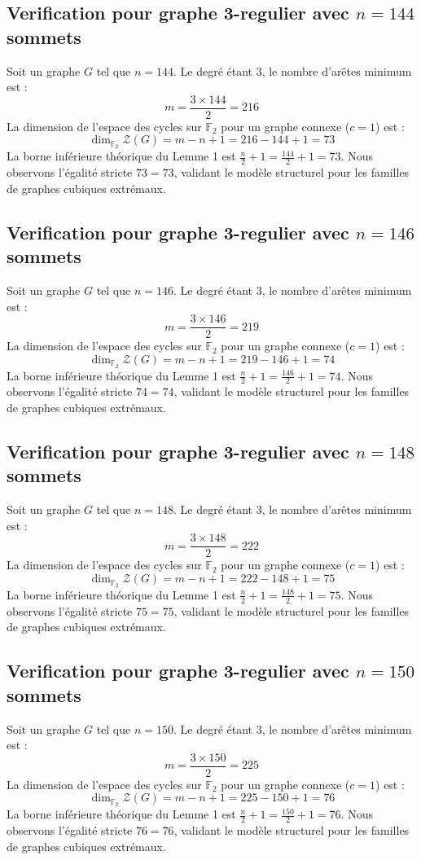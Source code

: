 \documentclass[11pt,a4paper]{article}
\begin{document}
\subsection{Verification pour graphe 3-regulier avec $n=144$ sommets}
Soit un graphe $G$ tel que $n = 144$. Le degré étant 3, le nombre d'arêtes minimum est :
$$ m = \frac{3 \times 144}{2} = 216 $$
La dimension de l'espace des cycles sur $\mathbb{F}_2$ pour un graphe connexe ($c=1$) est :
$$ \dim_{\mathbb{F}_2} \mathcal{Z}(G) = m - n + 1 = 216 - 144 + 1 = 73 $$
La borne inférieure théorique du Lemme 1 est $\frac{n}{2} + 1 = \frac{144}{2} + 1 = 73$.
Nous observons l'égalité stricte $73 = 73$, validant le modèle structurel pour les familles de graphes cubiques extrémaux.

\subsection{Verification pour graphe 3-regulier avec $n=146$ sommets}
Soit un graphe $G$ tel que $n = 146$. Le degré étant 3, le nombre d'arêtes minimum est :
$$ m = \frac{3 \times 146}{2} = 219 $$
La dimension de l'espace des cycles sur $\mathbb{F}_2$ pour un graphe connexe ($c=1$) est :
$$ \dim_{\mathbb{F}_2} \mathcal{Z}(G) = m - n + 1 = 219 - 146 + 1 = 74 $$
La borne inférieure théorique du Lemme 1 est $\frac{n}{2} + 1 = \frac{146}{2} + 1 = 74$.
Nous observons l'égalité stricte $74 = 74$, validant le modèle structurel pour les familles de graphes cubiques extrémaux.

\subsection{Verification pour graphe 3-regulier avec $n=148$ sommets}
Soit un graphe $G$ tel que $n = 148$. Le degré étant 3, le nombre d'arêtes minimum est :
$$ m = \frac{3 \times 148}{2} = 222 $$
La dimension de l'espace des cycles sur $\mathbb{F}_2$ pour un graphe connexe ($c=1$) est :
$$ \dim_{\mathbb{F}_2} \mathcal{Z}(G) = m - n + 1 = 222 - 148 + 1 = 75 $$
La borne inférieure théorique du Lemme 1 est $\frac{n}{2} + 1 = \frac{148}{2} + 1 = 75$.
Nous observons l'égalité stricte $75 = 75$, validant le modèle structurel pour les familles de graphes cubiques extrémaux.

\subsection{Verification pour graphe 3-regulier avec $n=150$ sommets}
Soit un graphe $G$ tel que $n = 150$. Le degré étant 3, le nombre d'arêtes minimum est :
$$ m = \frac{3 \times 150}{2} = 225 $$
La dimension de l'espace des cycles sur $\mathbb{F}_2$ pour un graphe connexe ($c=1$) est :
$$ \dim_{\mathbb{F}_2} \mathcal{Z}(G) = m - n + 1 = 225 - 150 + 1 = 76 $$
La borne inférieure théorique du Lemme 1 est $\frac{n}{2} + 1 = \frac{150}{2} + 1 = 76$.
Nous observons l'égalité stricte $76 = 76$, validant le modèle structurel pour les familles de graphes cubiques extrémaux.
\end{document}
